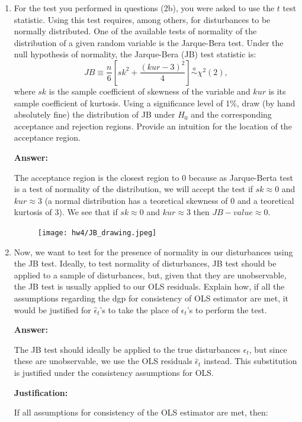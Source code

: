 \documentclass[12pt,a4paper]{article}
\begin{document}
\begin{enumerate}[label=(\alph*)]
    \item For the test you performed in questions (2b), you were asked to use the $t$ test statistic. Using this test requires, among others, for disturbances to be normally distributed. One of the available tests of normality of the distribution of a given random variable is the Jarque-Bera test. Under the null hypothesis of normality, the Jarque-Bera (JB) test statistic is:
  \[
  JB \equiv \frac{n}{6}\left[sk^2 + \frac{(kur - 3)^2}{4}\right] \stackrel{a}{\sim} \chi^2(2),
  \]
  where $sk$ is the sample coefficient of skewness of the variable and $kur$ is its sample coefficient of kurtosis. Using a significance level of 1\%, draw (by hand absolutely fine) the distribution of JB under $H_0$ and the corresponding acceptance and rejection regions. Provide an intuition for the location of the acceptance region.

    \textbf{Answer:}

The acceptance region is the closest region to 0 because as Jarque-Berta test is a test of normality of the distribution, we will accept the test if $sk \approx 0 $ and $kur \approx 3$ (a normal distribution has a teoretical skewness of 0 and a teoretical kurtosis of 3). We see that if $sk \approx 0 $ and $kur \approx 3$ then $JB-value \approx 0$.

\begin{figure}[H]
  \centering
  \texttt{[image: hw4/JB\_drawing.jpeg]}
\end{figure}


  
  \item Now, we want to test for the presence of normality in our disturbances using the JB test. Ideally, to test normality of disturbances, JB test should be applied to a sample of disturbances, but, given that they are unobservable, the JB test is usually applied to our OLS residuals. Explain how, if all the assumptions regarding the dgp for consistency of OLS estimator are met, it would be justified for $\hat{\epsilon}_t$'s to take the place of $\epsilon_t$'s to perform the test.
  
  \textbf{Answer:}

The JB test should ideally be applied to the true disturbances $\epsilon_t$, but since these are unobservable, we use the OLS residuals $\hat{\epsilon}_t$ instead. This substitution is justified under the consistency assumptions for OLS.

\textbf{Justification:}

If all assumptions for consistency of the OLS estimator are met, then:


\end{enumerate}
\end{document}
